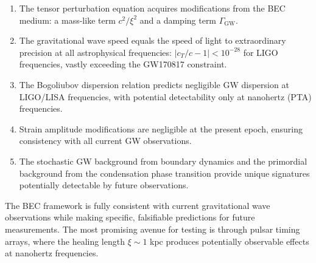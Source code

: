 \documentclass[11pt,a4paper]{article}
\newcommand{\cT}{\ensuremath{c_T}}
\theoremstyle{definition}
\theoremstyle{remark}
\begin{document}
\begin{enumerate}[leftmargin=*, itemsep=0.3em]
\item The tensor perturbation equation acquires modifications from the BEC medium: a mass-like term $c^2/\xi^2$ and a damping term $\Gamma_{\mathrm{GW}}$.

\item The gravitational wave speed equals the speed of light to extraordinary precision at all astrophysical frequencies: $|\cT/c - 1| < 10^{-28}$ for LIGO frequencies, vastly exceeding the GW170817 constraint.

\item The Bogoliubov dispersion relation predicts negligible GW dispersion at LIGO/LISA frequencies, with potential detectability only at nanohertz (PTA) frequencies.

\item Strain amplitude modifications are negligible at the present epoch, ensuring consistency with all current GW observations.

\item The stochastic GW background from boundary dynamics and the primordial background from the condensation phase transition provide unique signatures potentially detectable by future observations.
\end{enumerate}

The BEC framework is fully consistent with current gravitational wave observations while making specific, falsifiable predictions for future measurements. The most promising avenue for testing is through pulsar timing arrays, where the healing length $\xi \sim 1$ kpc produces potentially observable effects at nanohertz frequencies.
\end{document}
